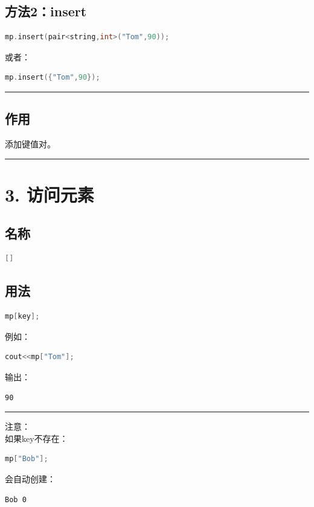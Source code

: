 \documentclass[9pt,twocolumn]{extarticle}
\begin{document}
\subsection{方法2：insert}
\begin{lstlisting}[language=C++]
mp.insert(pair<string,int>("Tom",90));
\end{lstlisting}
或者：
\begin{lstlisting}[language=C++]
mp.insert({"Tom",90});
\end{lstlisting}

\noindent\rule{\linewidth}{0.4pt}

\subsection{作用}
添加键值对。

\noindent\rule{\linewidth}{0.4pt}

\section{3. 访问元素}

\subsection{名称}
\begin{lstlisting}[language=C++]
[]
\end{lstlisting}

\subsection{用法}
\begin{lstlisting}[language=C++]
mp[key];
\end{lstlisting}
例如：
\begin{lstlisting}[language=C++]
cout<<mp["Tom"];
\end{lstlisting}
输出：
\begin{lstlisting}
90
\end{lstlisting}

\noindent\rule{\linewidth}{0.4pt}

注意：\\
如果key不存在：
\begin{lstlisting}[language=C++]
mp["Bob"];
\end{lstlisting}
会自动创建：
\begin{lstlisting}
Bob 0
\end{lstlisting}
\end{document}
